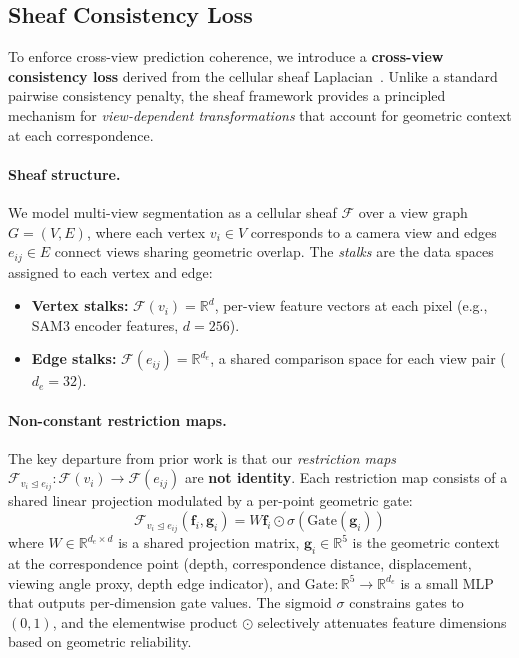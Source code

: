 
\subsection{Sheaf Consistency Loss}
\label{sec:sheaf}

To enforce cross-view prediction coherence, we introduce a \textbf{cross-view consistency loss} derived from the cellular sheaf Laplacian~\cite{currysheaf,sheafnn}. Unlike a standard pairwise consistency penalty, the sheaf framework provides a principled mechanism for \emph{view-dependent transformations} that account for geometric context at each correspondence.

\paragraph{Sheaf structure.} We model multi-view segmentation as a cellular sheaf $\mathcal{F}$ over a view graph $G = (V, E)$, where each vertex $v_i \in V$ corresponds to a camera view and edges $e_{ij} \in E$ connect views sharing geometric overlap. The \emph{stalks} are the data spaces assigned to each vertex and edge:
\begin{itemize}[nosep,leftmargin=*]
    \item \textbf{Vertex stalks:} $\mathcal{F}(v_i) = \mathbb{R}^d$, per-view feature vectors at each pixel (e.g., SAM3 encoder features, $d = 256$).
    \item \textbf{Edge stalks:} $\mathcal{F}(e_{ij}) = \mathbb{R}^{d_e}$, a shared comparison space for each view pair ($d_e = 32$).
\end{itemize}

\paragraph{Non-constant restriction maps.} The key departure from prior work is that our \emph{restriction maps} $\mathcal{F}_{v_i \trianglelefteq e_{ij}}: \mathcal{F}(v_i) \to \mathcal{F}(e_{ij})$ are \textbf{not identity}. Each restriction map consists of a shared linear projection modulated by a per-point geometric gate:
\begin{equation}
\mathcal{F}_{v_i \trianglelefteq e_{ij}}(\mathbf{f}_i, \mathbf{g}_i) = W \mathbf{f}_i \odot \sigma(\text{Gate}(\mathbf{g}_i))
\label{eq:restriction}
\end{equation}
where $W \in \mathbb{R}^{d_e \times d}$ is a shared projection matrix, $\mathbf{g}_i \in \mathbb{R}^{5}$ is the geometric context at the correspondence point (depth, correspondence distance, displacement, viewing angle proxy, depth edge indicator), and $\text{Gate}: \mathbb{R}^5 \to \mathbb{R}^{d_e}$ is a small MLP that outputs per-dimension gate values. The sigmoid $\sigma$ constrains gates to $(0, 1)$, and the elementwise product $\odot$ selectively attenuates feature dimensions based on geometric reliability.

